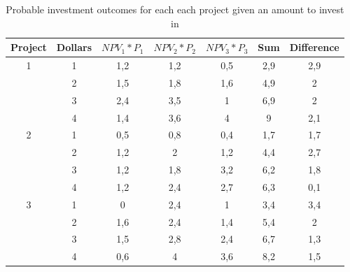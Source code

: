 \documentclass[a4paper,11pt]{article}
\begin{document}
\begin{table}[]
\centering
\begin{tabular}{ccccc|c|c}
\hline
\textbf{Project} & \textbf{Dollars} & $NPV_1*P_1$ & $NPV_2*P_2$ & $NPV_3*P_3$ & \textbf{Sum} & \textbf{Difference} \\

\hline
1                & 1                & 1,2                 & 1,2                 & 0,5                 & 2,9          & 2,9           \\
                & 2                & 1,5                 & 1,8                 & 1,6                 & 4,9          & 2             \\
                & 3                & 2,4                 & 3,5                 & 1                   & 6,9          & 2             \\
                & 4                & 1,4                 & 3,6                 & 4                   & 9            & 2,1           \\ \hline
2                & 1                & 0,5                 & 0,8                 & 0,4                 & 1,7          & 1,7           \\
                & 2                & 1,2                 & 2                   & 1,2                 & 4,4          & 2,7           \\
                & 3                & 1,2                 & 1,8                 & 3,2                 & 6,2          & 1,8           \\
                & 4                & 1,2                 & 2,4                 & 2,7                 & 6,3          & 0,1           \\ \hline
3                & 1                & 0                   & 2,4                 & 1                   & 3,4          & 3,4           \\ 
                & 2                & 1,6                 & 2,4                 & 1,4                 & 5,4          & 2             \\
                & 3                & 1,5                 & 2,8                 & 2,4                 & 6,7          & 1,3           \\
                & 4                & 0,6                 & 4                   & 3,6                 & 8,2          & 1,5          \\
\hline
\end{tabular}
\caption{Probable investment outcomes for each each project given an amount to invest in}
\label{q4:tblCis}
\end{table}
\end{document}
